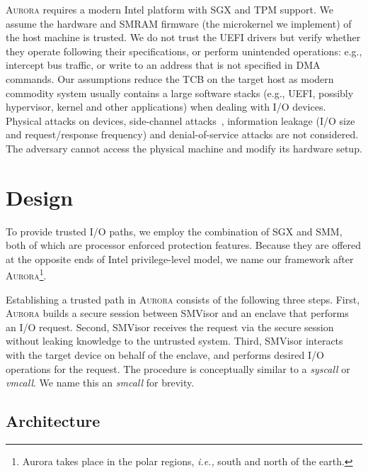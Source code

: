 \documentclass[journal,twocolumn,letterpaper,10pt]{IEEEtran}
\begin{document}
\textsc{Aurora} requires a modern Intel platform with SGX and TPM support. We assume the hardware and SMRAM firmware (the microkernel we implement) of the host machine is trusted. We do not trust the UEFI drivers but verify whether they operate following their specifications, or perform unintended operations: e.g., intercept bus traffic, or write to an address that is not specified in DMA commands. Our assumptions  reduce the TCB on the target host as modern commodity system usually contains a large software stacks (e.g., UEFI, possibly hypervisor, kernel and other applications) when dealing with I/O devices.
Physical attacks on devices, side-channel attacks~\cite{chen2019sgxpectre, ridl}, information leakage (I/O size and request/response frequency) and denial-of-service attacks are not considered. The adversary cannot access the physical machine and modify its hardware setup. %


\section{Design}
To provide trusted I/O paths, we employ the combination of SGX and SMM, both of which are processor enforced protection features. Because they are offered at the opposite ends of Intel privilege-level model, we name our framework after \textsc{Aurora}\footnote{Aurora takes place in the polar regions, \emph{i.e.,} south and north of the earth.}.

Establishing a trusted path in \textsc{Aurora} consists of the following three steps. First, \textsc{Aurora} builds a secure session between SMVisor and an enclave that performs an I/O request. Second, SMVisor receives the request via the secure session without leaking knowledge to the untrusted system. Third, SMVisor interacts with the target device on behalf of the enclave, and performs desired I/O operations for the request. The procedure is conceptually similar to a \textit{syscall} or \textit{vmcall}. We name this an \textit{smcall} for brevity.

\subsection{Architecture}\label{arch}
\end{document}
